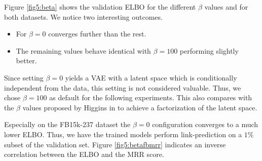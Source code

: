 Figure \ref{fig5:beta} shows the validation ELBO for the different $\beta$ values and for both datasets. We notice two interesting outcomes.  

\begin{itemize}
    \item For $\beta = 0$ converges further than the rest.
    \item The remaining values behave identical with $\beta = 100$ performing slightly better. 
\end{itemize}

Since setting $\beta = 0$ yields a VAE with a latent space which is conditionally independent from the data, this setting is not considered valuable. Thus, we chose $\beta = 100$ as default for the following experiments. This also compares with the $\beta$ values proposed by Higgins in \cite{higgins_beta-vae_2016} to achieve a factorization of the latent space.

Especially on the FB15k-237 dataset the $\beta = 0$ configuration converges to a much lower ELBO. Thus, we have the trained models perform link-prediction on a $1\%$ subset of the validation set. Figure \ref{fig5:betafbmrr} indicates an inverse correlation between the ELBO and the MRR score. 




